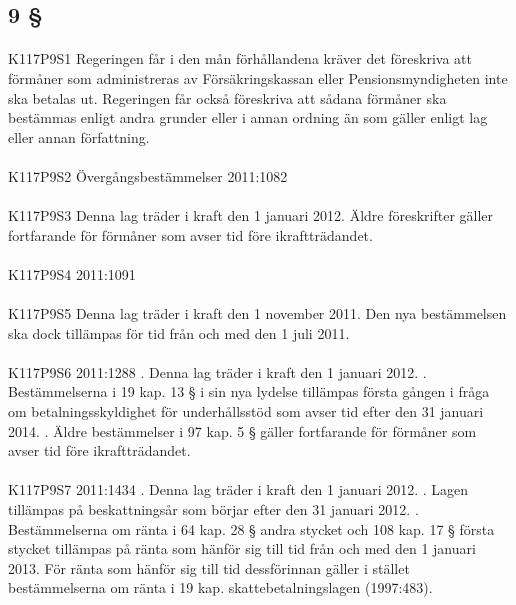 \documentclass[a4paper,notitlepage,openany,10pt]{book}
\begin{document}
\subsection*{9 §}
\paragraph*{}
{\tiny K117P9S1}
Regeringen får i den mån förhållandena kräver det föreskriva att förmåner som administreras av Försäkringskassan eller Pensionsmyndigheten inte ska betalas ut. Regeringen får också föreskriva att sådana förmåner ska bestämmas enligt andra grunder eller i annan ordning än som gäller enligt lag eller annan författning.
\paragraph*{}
{\tiny K117P9S2}
Övergångsbestämmelser
2011:1082
\paragraph*{}
{\tiny K117P9S3}
Denna lag träder i kraft den 1 januari 2012. Äldre föreskrifter gäller fortfarande för förmåner som avser tid före ikraftträdandet.
\paragraph*{}
{\tiny K117P9S4}
2011:1091
\paragraph*{}
{\tiny K117P9S5}
Denna lag träder i kraft den 1 november 2011. Den nya bestämmelsen ska dock tillämpas för tid från och med den 1 juli 2011.
\paragraph*{}
{\tiny K117P9S6}
2011:1288
. Denna lag träder i kraft den 1 januari 2012.
. Bestämmelserna i 19 kap. 13 § i sin nya lydelse tillämpas första gången i fråga om betalningsskyldighet för underhållsstöd som avser tid efter den 31 januari 2014.
. Äldre bestämmelser i 97 kap. 5 § gäller fortfarande för förmåner som avser tid före ikraftträdandet.
\paragraph*{}
{\tiny K117P9S7}
2011:1434
. Denna lag träder i kraft den 1 januari 2012.
. Lagen tillämpas på beskattningsår som börjar efter den 31 januari 2012.
. Bestämmelserna om ränta i 64 kap. 28 § andra stycket och 108 kap. 17 § första stycket tillämpas på ränta som hänför sig till tid från och med den 1 januari 2013. För ränta som hänför sig till tid dessförinnan gäller i stället bestämmelserna om ränta i 19 kap. skattebetalningslagen (1997:483).
\end{document}
